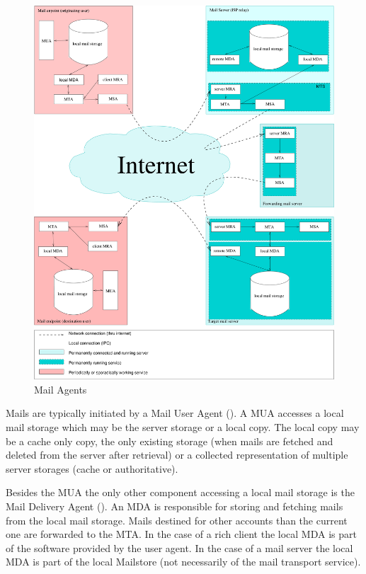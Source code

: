 \begin{figure}[htb]
  \centering\includegraphics[width=\textwidth]{inc/MailAgents1}
  \caption{Mail Agents}
  \label{fig:MailAgents}
\end{figure}

Mails are typically initiated by a Mail User Agent (). A MUA accesses a local mail storage which may be the server storage or a local copy. The local copy may be a cache only copy, the only existing storage (when mails are fetched and deleted from the server after retrieval)  or a collected representation of multiple server storages (cache or authoritative).\par

Besides the MUA the only other component accessing a local mail storage is the Mail Delivery Agent (). An MDA is responsible for storing and fetching mails from the local mail storage. Mails destined for other accounts than the current one are forwarded to the MTA. In the case of a rich client the local MDA is part of the software provided by the user agent. In the case of a mail server the local MDA is part of the local Mailstore (not necessarily of the mail transport service).

